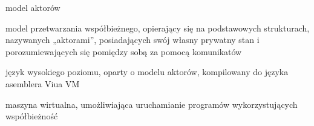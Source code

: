 \documentclass[11pt,oneside,a4paper,titlepage,onecolumn]{article}
\begin{document}
\begin{labeling}{model aktorów}
    \item [model aktorów] model przetwarzania współbieżnego, opierający się na podstawowych strukturach, nazywanych „aktorami”, posiadających swój własny prywatny stan i porozumiewających się pomiędzy sobą za pomocą komunikatów
    \item [ViuAct] język wysokiego poziomu, oparty o modelu aktorów, kompilowany do języka asemblera Viua VM
    \item [Viua VM] maszyna wirtualna, umożliwiająca uruchamianie programów wykorzystujących współbieżność
\end{labeling}
\end{document}
